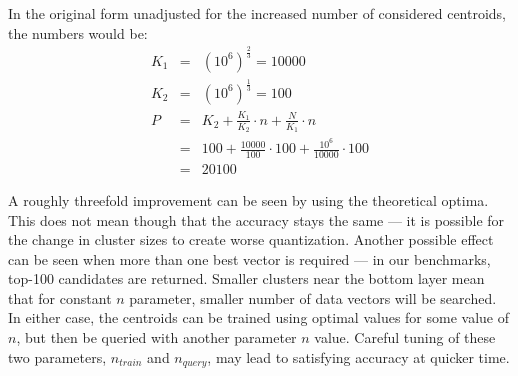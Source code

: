In the original form unadjusted for the increased number of considered centroids,
the numbers would be:
\begin{eqnarray*}
K_1 & = & (10^6)^{\frac{2}{3}} = 10000 \\
K_2 & = & (10^6)^{\frac{1}{3}} = 100 \\
P & = & K_2 + \frac{K_1}{K_2} \cdot n + \frac{N}{K_1} \cdot n  \\
 & = & 100 + \frac{10000}{100} \cdot 100 + \frac{10^6}{10000} \cdot 100 \\ 
& = &  20100
\end{eqnarray*}

A roughly threefold improvement can be seen by using the theoretical optima.
This does not mean though that the accuracy stays the same --- it is possible
for the change in cluster sizes to create worse quantization. Another
possible effect can be seen when more than one best vector is required ---
in our benchmarks, top-100 candidates are returned. Smaller clusters near
the bottom layer mean that for constant $n$ parameter, smaller number of
data vectors will be searched.
In either case, the centroids can
be trained using optimal values for some value of $n$, but then be queried
with another parameter $n$ value. Careful tuning of these two parameters, 
$n_{train}$ and $n_{query}$, may lead to satisfying accuracy at quicker time.

